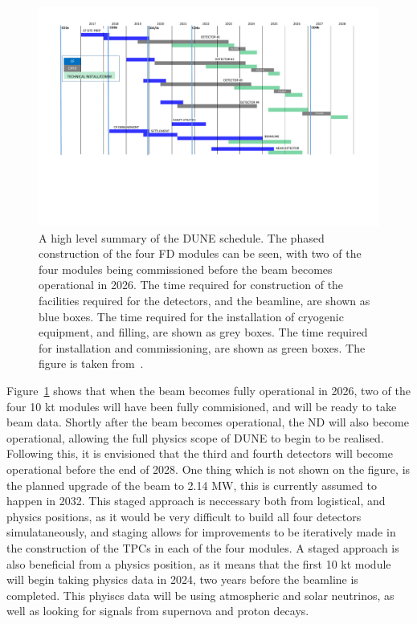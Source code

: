 \begin{figure}
  \centering
  \includegraphics[width=\textwidth]{summary-schedule}
  \caption[A high level summary of the DUNE schedule]
          {A high level summary of the DUNE schedule. The phased construction of the four FD modules can be seen, with two of the four modules being commissioned before the beam becomes operational in 2026. The time required for construction of the facilities required for the detectors, and the beamline, are shown as blue boxes. The time required for the installation of cryogenic equipment, and filling, are shown as grey boxes. The time required for installation and commissioning, are shown as green boxes. The figure is taken from~\citep{DUNECDR_V1}.}
  \label{fig:DUNE_Sched}
\end{figure}

Figure~\ref{fig:DUNE_Sched} shows that when the beam becomes fully operational in 2026, two of the four 10 kt modules will have been fully commisioned, and will be ready to take beam data. Shortly after the beam becomes operational, the ND will also become operational, allowing the full physics scope of DUNE to begin to be realised. Following this, it is envisioned that the third and fourth detectors will become operational before the end of 2028. One thing which is not shown on the figure, is the planned upgrade of the beam to 2.14 MW, this is currently assumed to happen in 2032. This staged approach is neccessary both from logistical, and physics positions, as it would be very difficult to build all four detectors simulataneously, and staging allows for improvements to be iteratively made in the construction of the TPCs in each of the four modules. A staged approach is also beneficial from a physics position, as it means that the first 10 kt module will begin taking physics data in 2024, two years before the beamline is completed. This phyiscs data will be using atmospheric and solar neutrinos, as well as looking for signals from supernova and proton decays. \\

